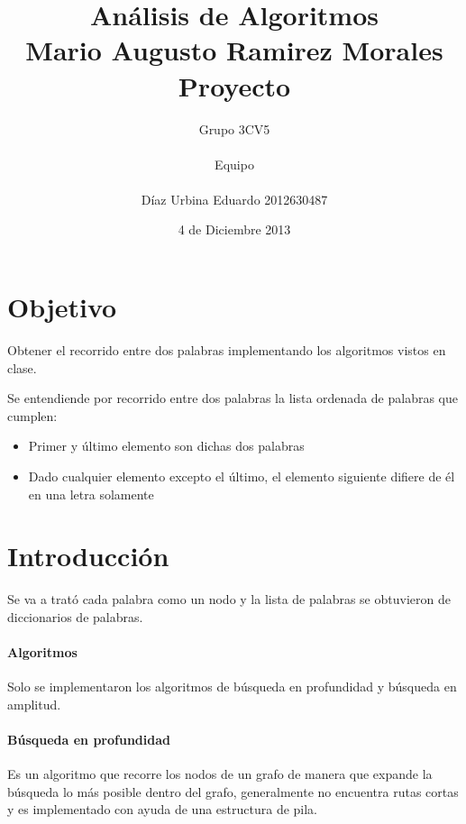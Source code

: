 \documentclass[40pt,a4paper]{article}
\begin{document}
\title{
Análisis de Algoritmos\\
{\small Mario Augusto Ramirez Morales\\}
Proyecto\\
}
\author{
Grupo 3CV5\\ \\
Equipo\\ \\
Díaz Urbina Eduardo 2012630487\\
}
\date{4 de Diciembre 2013}
\maketitle

\section{Objetivo}

Obtener el recorrido entre dos palabras implementando los algoritmos
vistos en clase.

Se entendiende por recorrido entre dos palabras la lista ordenada
de palabras que cumplen:

\begin{itemize}
	\item Primer y último elemento son dichas dos palabras
	\item Dado cualquier elemento excepto el último, el elemento
	      siguiente difiere de él en una letra solamente
\end{itemize}

\section{Introducción}

Se va a trató cada palabra como un nodo y la lista de palabras se
obtuvieron de diccionarios de palabras.

\paragraph{Algoritmos}
Solo se implementaron los algoritmos de búsqueda en profundidad y
búsqueda en amplitud.

\paragraph{Búsqueda en profundidad}
Es un algoritmo que recorre los nodos de un grafo de manera que
expande la búsqueda lo más posible dentro del grafo, generalmente
no encuentra rutas cortas y es implementado con ayuda de una estructura
de pila.
\end{document}
